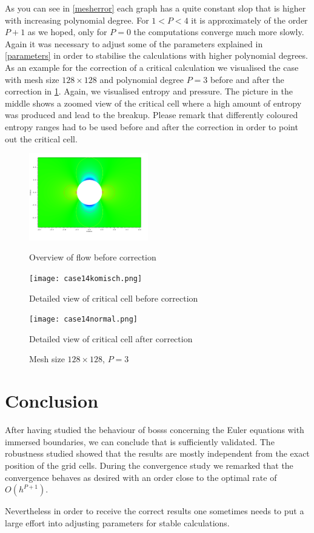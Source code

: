 	As you can see in \cref{mesherror} each graph has a quite constant slop that is higher with increasing polynomial degree. For $1 < P < 4$ it is approximately of the order $P+1$ as we hoped, only for $P = 0$ the computations converge much more slowly.\\ \indent
	Again it was necessary to adjust some of the parameters explained in \cref{parameters} in order to stabilise the calculations with higher polynomial degrees. \\ \indent
	As an example for the correction of a critical calculation we visualised the case with mesh size $128 \times 128$ and polynomial degree $P = 3$ before and after the correction in \cref{fig:case14}. Again, we visualised entropy and pressure. The picture in the middle shows a zoomed view of the critical cell where a high amount of entropy was produced and lead to the breakup. Please remark that differently coloured entropy ranges had to be used before and after the correction in order to point out the critical cell.
	\begin{figure}[htp]
		\centering
		\begin{minipage}[b]{0.3\textwidth}
			\centering
			\includegraphics[height=3.8cm]{img/case14.png}
			\caption*{Overview of flow before correction}
		\end{minipage}
		\quad
		\begin{minipage}[b]{0.3\textwidth}
			\centering
			\texttt{[image: case14komisch.png]}
			\caption*{Detailed view of critical cell before correction}
			\label{fig:case14detail}
		\end{minipage}
		\quad
		\begin{minipage}[b]{0.3\textwidth}
			\centering
			\texttt{[image: case14normal.png]}
			\caption*{Detailed view of critical cell after correction}
			\label{fig:case14detailneu}
		\end{minipage}
		\caption{Mesh size $128 \times 128$, $P = 3$}
		\label{fig:case14}
	\end{figure}
	
	\section{Conclusion}
	
	After having studied the behaviour of \gls{bosss} concerning the Euler equations with immersed boundaries, we can conclude that is sufficiently validated. The robustness studied showed that the results are mostly independent from the exact position of the grid cells. During the convergence study we remarked  that the convergence behaves as desired with an order close to the optimal rate of $O(h^{P+1})$. 
	
	Nevertheless in order to receive the correct results one sometimes needs to put a large effort into adjusting parameters for stable calculations. 